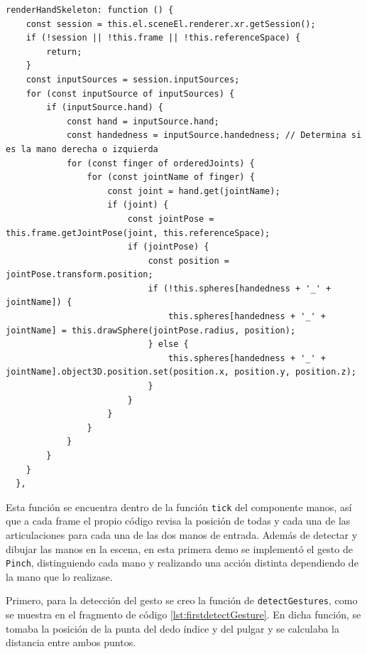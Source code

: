 \documentclass[a4paper, 12pt]{book}
\begin{document}
\begin{lstlisting}[caption=Dibujo de las manos en la escena, captionpos=b, label=lst:manos-codigo]
  renderHandSkeleton: function () {
    const session = this.el.sceneEl.renderer.xr.getSession();
    if (!session || !this.frame || !this.referenceSpace) {
        return;
    }
    const inputSources = session.inputSources;
    for (const inputSource of inputSources) {
        if (inputSource.hand) {
            const hand = inputSource.hand;
            const handedness = inputSource.handedness; // Determina si es la mano derecha o izquierda
            for (const finger of orderedJoints) {
                for (const jointName of finger) {
                    const joint = hand.get(jointName);
                    if (joint) {
                        const jointPose = this.frame.getJointPose(joint, this.referenceSpace);
                        if (jointPose) {
                            const position = jointPose.transform.position;
                            if (!this.spheres[handedness + '_' + jointName]) {
                                this.spheres[handedness + '_' + jointName] = this.drawSphere(jointPose.radius, position);
                            } else {
                                this.spheres[handedness + '_' + jointName].object3D.position.set(position.x, position.y, position.z);
                            }
                        }
                    }
                }
            }
        }
    }
  },
\end{lstlisting}

Esta función se encuentra dentro de la función \texttt{tick} del componente manos, así que a cada frame el propio código revisa la posición de todas y cada una de las articulaciones para cada una 
de las dos manos de entrada.
Además de detectar y dibujar las manos en la escena, en esta primera demo se implementó el gesto de \texttt{Pinch}, distinguiendo cada mano y realizando una acción distinta dependiendo de la mano que lo realizase. 

Primero, para la detección del gesto se creo la función de \texttt{detectGestures}, como se muestra en el fragmento de código \ref{lst:firstdetectGesture}. En dicha función, se tomaba la posición de la punta del dedo índice y del pulgar y se calculaba la distancia entre ambos puntos.
\end{document}
